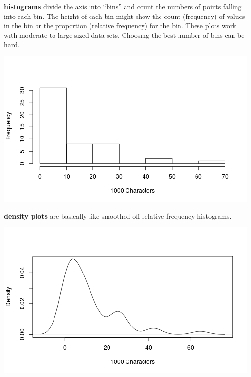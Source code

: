 \begin{list}{}{}
\begin{list}{}{}
  \item [\bf histograms] divide the axis into ``bins'' and count the
    numbers of points falling into each bin.  The height of each bin might
    show the count (frequency) of values in the bin or the proportion
    (relative frequency) for the bin.  These plots work with moderate
    to large sized data sets.  Choosing the best number of bins can be
    hard. \vspace{-.4cm}
  \begin{center}
  \includegraphics[width = .6\linewidth]{plots/histogramDemo1.png}
  \end{center}


  \item [\bf density plots] are basically like smoothed off
        relative frequency histograms. \vspace{-.4cm}

  \begin{center}
  \includegraphics[width = .6\linewidth]{plots/densityDemo1.png}
  \end{center}


\end{list}
\end{list}
